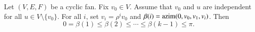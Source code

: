 \begin{lemma}[monotonicity]  \label{lemma:monotone}
Let $(V,E,F)$ be a cyclic fan. Fix $v_0\in V$.  Assume that $v_0$ and $u$ are independent for all $u\in V\setminus\{v_0\}$.  For all $i$, set $v_i = \rho^i v_0$ and $\beta(i) = {\operatorname{azim}}(0,v_0,v_1,v_i)$.
Then
$$0=\beta(1)\le \beta(2)\le \cdots\le \beta(k-1)\le\pi.$$
%
\end{lemma}

